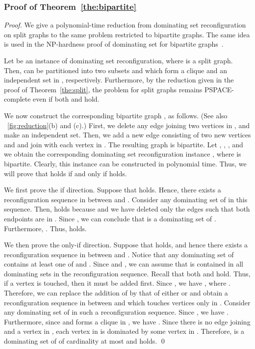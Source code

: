 \documentclass{llncs}
\begin{document}
\subsubsection{Proof of Theorem~\ref{the:bipartite}}
\begin{proof}
We give a polynomial-time reduction from {\sc dominating set reconfiguration}
on split graphs to the same problem restricted to bipartite graphs.
The same idea is used in the NP-hardness proof of {\sc dominating set} for bipartite graphs~\cite{Ber84}.
	
Let  be an instance
of {\sc dominating set reconfiguration}, where  is a split graph.
Then,  can be partitioned into two subsets  and  which
form a clique and an independent set in , respectively.
Furthermore, by the reduction given in the proof of Theorem~\ref{the:split}, the problem
for split graphs remains PSPACE-complete even if both  and  hold. 	
	
We now construct the corresponding bipartite graph , as follows.
(See also \figurename~\ref{fig:reduction}(b) and (c).)
First, we delete any edge joining two vertices in , and make  an independent set.
Then, we add a new edge consisting of two new vertices  and  and join  with each vertex in .
The resulting graph  is bipartite.
Let , , , and we
obtain the corresponding {\sc dominating set reconfiguration} instance , where  is bipartite.
Clearly, this instance can be constructed in polynomial time.
Thus, we will prove that  holds if and only if  holds.

We first prove the if direction.
Suppose that  holds. Hence, there exists
a reconfiguration sequence in  between  and .
Consider any dominating set  of  in this sequence.
Then,  holds because  and we
have deleted only the edges such that both endpoints are in .
Since , we can conclude that  is a dominating set of .
Furthermore, .
Thus,  holds.

We then prove the only-if direction.
Suppose that  holds, and hence there exists a
reconfiguration sequence in  between  and .
Notice that any dominating set of  contains at least one of  and .
Since  and , we can assume that  is
contained in all dominating sets in the reconfiguration sequence.
Recall that both  and  hold.
Thus, if a vertex  is touched, then it must be added first.
Since , we have , where .
Therefore, we can replace the addition of  by that of either  or  and
obtain a reconfiguration sequence in  between  and  which touches vertices only in .
Consider any dominating set  of  in such a reconfiguration sequence.
Since , we have .
Furthermore, since  and  forms a clique
in , we have .
Since there is no edge joining  and a vertex in , each vertex in
 is dominated by some vertex in .
Therefore,  is a dominating set of  of
cardinality at most  and  holds.
\qed
\end{proof}
\end{document}
